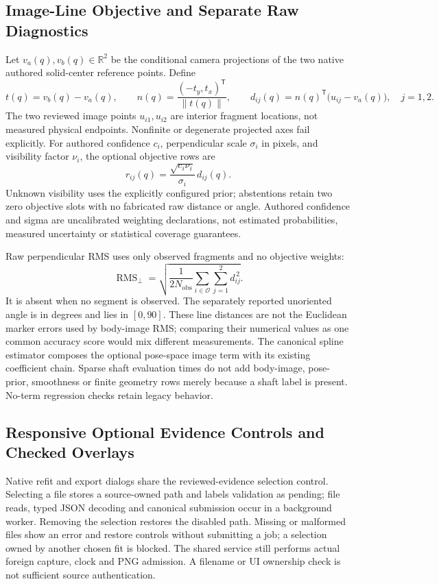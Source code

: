 \documentclass[11pt,letterpaper]{article}
\newcommand{\R}{\mathbb{R}}
\begin{document}
\subsection{Image-Line Objective and Separate Raw Diagnostics}
Let $v_a(q),v_b(q)\in\R^2$ be the conditional camera projections of the two
native authored solid-center reference points. Define
\begin{equation}
 t(q)=v_b(q)-v_a(q),\qquad
 n(q)=\frac{(-t_y,t_x)^\mathsf{T}}{\lVert t(q)\rVert},\qquad
 d_{ij}(q)=n(q)^\mathsf{T}\bigl(u_{ij}-v_a(q)\bigr),\quad j=1,2.
\end{equation}
The two reviewed image points $u_{i1},u_{i2}$ are interior fragment locations,
not measured physical endpoints. Nonfinite or degenerate projected axes fail
explicitly. For authored confidence $c_i$, perpendicular scale $\sigma_i$ in
pixels, and visibility factor $\nu_i$, the optional objective rows are
\begin{equation}
 r_{ij}(q)=\frac{\sqrt{c_i\nu_i}}{\sigma_i}\,d_{ij}(q).
\end{equation}
Unknown visibility uses the explicitly configured prior; abstentions retain
two zero objective slots with no fabricated raw distance or angle. Authored
confidence and sigma are uncalibrated weighting declarations, not estimated
probabilities, measured uncertainty or statistical coverage guarantees.

Raw perpendicular RMS uses only observed fragments and no objective weights:
\begin{equation}
 \operatorname{RMS}_{\perp}
 =\sqrt{\frac{1}{2N_{\mathrm{obs}}}
   \sum_{i\in\mathcal O}\sum_{j=1}^{2}d_{ij}^{\,2}}.
\end{equation}
It is absent when no segment is observed. The separately reported unoriented
angle is in degrees and lies in $[0,90]$. These line distances are not the
Euclidean marker errors used by body-image RMS; comparing their numerical
values as one common accuracy score would mix different measurements.
The canonical spline estimator composes the optional pose-space image term
with its existing coefficient chain. Sparse shaft evaluation times do not add
body-image, pose-prior, smoothness or finite geometry rows merely because a
shaft label is present. No-term regression checks retain legacy behavior.

\subsection{Responsive Optional Evidence Controls and Checked Overlays}
Native refit and export dialogs share the reviewed-evidence selection control.
Selecting a file stores a source-owned path and labels validation as pending;
file reads, typed JSON decoding and canonical submission occur in a background
worker. Removing the selection restores the disabled path. Missing or malformed
files show an error and restore controls without submitting a job; a selection
owned by another chosen fit is blocked. The shared service still performs
actual foreign capture, clock and PNG admission. A filename or UI ownership
check is not sufficient source authentication.
\end{document}
